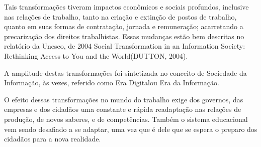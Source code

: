 \documentclass[
12pt,		%
openright,	%
twoside,  %
a4paper,			%
chapter=TITLE,		%
english,			%
french,				%
spanish,			%
brazil				%
]{USPSC-classe/USPSC}
\begin{document}
Tais transforma\c{c}\~oes tiveram impactos econ\^omicos e sociais profundos, inclusive nas rela\c{c}\~oes de trabalho, tanto na cria\c{c}\~ao e extin\c{c}\~ao de postos de trabalho,  quanto em suas formas de contrata\c{c}\~ao, jornada e remunera\c{c}\~ao; acarretando a precariza\c{c}\~ao dos direitos trabalhistas. Essas mudan\c{c}as est\~ao bem descritas  no relat\'orio da Unesco,  de 2004 \textquotedbl Social Transformation in an Information Society: Rethinking Access to You and the World\textquotedbl  (DUTTON, 2004).

















A amplitude destas transforma\c{c}\~oes foi sintetizada no conceito de \textquotedbl Sociedade da Informa\c{c}\~ao\textquotedbl , \`as vezes, referido como \textquotedbl Era Digital\textquotedbl  ou \textquotedbl Era da Informa\c{c}\~ao\textquotedbl .

















O efeito dessas transforma\c{c}\~oes no mundo do trabalho exige dos governos, das empresas e dos cidad\~aos uma constante e r\'apida readapta\c{c}\~ao  nas rela\c{c}\~oes de produ\c{c}\~ao, de novos saberes, e de  compet\^encias. Tamb\'em o sistema educacional vem sendo desafiado a se adaptar, uma vez que \'e dele que se espera o preparo dos cidad\~aos para a nova realidade.
\end{document}
